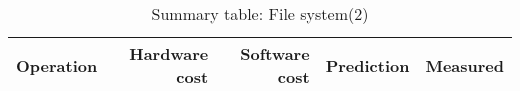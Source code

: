 \begin{table}[h]
\begin{center}
\begin{tabular}{| l | r | r | r | r |} \hline
Operation 			& Hardware cost 	& Software cost 	& Prediction	& Measured \\ \hline











\end{tabular}
\end{center}

\caption{Summary table: File system(2)}

\end{table}

